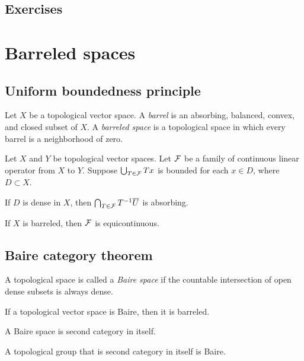 \documentclass{../../large}
\begin{document}
\begin{prb}
\end{prb}




\section*{Exercises}
\begin{prb}
\end{prb}





\chapter{Barreled spaces}

\section{Uniform boundedness principle}
\begin{prb}
Let $X$ be a topological vector space.
A \emph{barrel} is an absorbing, balanced, convex, and closed subset of $X$.
A \emph{barreled space} is a topological space in which every barrel is a neighborhood of zero.
\end{prb}


\begin{prb}
Let $X$ and $Y$ be topological vector spaces.
Let $\mathcal{F}$ be a family of continuous linear operator from $X$ to $Y$.
Suppose $\bigcup_{T\in\mathcal{F}}Tx$ is bounded for each $x\in D$, where $D\subset X$.
\begin{parts}
\item If $D$ is dense in $X$, then $\bigcap_{T\in\mathcal{F}}T^{-1}\overline U$ is absorbing.
\item If $X$ is barreled, then $\mathcal{F}$ is equicontinuous.
\end{parts}
\end{prb}



\section{Baire category theorem}

\begin{prb}
A topological space is called a \emph{Baire space} if the countable intersection of open dense subsets is always dense.
\begin{parts}
\item If a topological vector space is Baire, then it is barreled.
\item A Baire space is second category in itself.
\item A topological group that is second category in itself is Baire.
\end{parts}
\end{prb}
\end{document}
